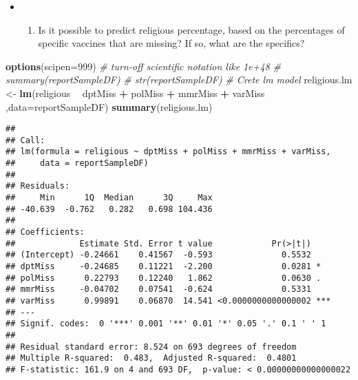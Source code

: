 \documentclass[]{article}
\newenvironment{Shaded}{\begin{snugshade}}{\end{snugshade}}
\newcommand{\CommentTok}[1]{\textcolor[rgb]{0.56,0.35,0.01}{\textit{#1}}}
\newcommand{\DataTypeTok}[1]{\textcolor[rgb]{0.13,0.29,0.53}{#1}}
\newcommand{\DecValTok}[1]{\textcolor[rgb]{0.00,0.00,0.81}{#1}}
\newcommand{\KeywordTok}[1]{\textcolor[rgb]{0.13,0.29,0.53}{\textbf{#1}}}
\newcommand{\NormalTok}[1]{#1}
\newcommand{\OperatorTok}[1]{\textcolor[rgb]{0.81,0.36,0.00}{\textbf{#1}}}
\newcommand{\StringTok}[1]{\textcolor[rgb]{0.31,0.60,0.02}{#1}}
\providecommand{\tightlist}{%
  \setlength{\itemsep}{0pt}\setlength{\parskip}{0pt}}
\begin{document}
\begin{itemize}
\item
  \begin{enumerate}
  \def\labelenumi{\arabic{enumi}.}
  \setcounter{enumi}{11}
  \tightlist
  \item
    Is it possible to predict religious percentage, based on the
    percentages of specific vaccines that are missing? If so, what are
    the specifics?
  \end{enumerate}
\end{itemize}

\begin{Shaded}
\begin{Highlighting}[]
\KeywordTok{options}\NormalTok{(}\DataTypeTok{scipen=}\DecValTok{999}\NormalTok{)  }\CommentTok{# turn-off scientific notation like 1e+48}
\CommentTok{# summary(reportSampleDF)}
\CommentTok{# str(reportSampleDF)}
\CommentTok{# Crete lm model}
\NormalTok{religious.lm <-}\StringTok{ }\KeywordTok{lm}\NormalTok{(religious }\OperatorTok{~}\StringTok{ }\NormalTok{dptMiss }\OperatorTok{+}\StringTok{ }\NormalTok{polMiss }\OperatorTok{+}\StringTok{ }\NormalTok{mmrMiss }\OperatorTok{+}\StringTok{ }\NormalTok{varMiss ,}\DataTypeTok{data=}\NormalTok{reportSampleDF) }
\KeywordTok{summary}\NormalTok{(religious.lm)}
\end{Highlighting}
\end{Shaded}

\begin{verbatim}
## 
## Call:
## lm(formula = religious ~ dptMiss + polMiss + mmrMiss + varMiss, 
##     data = reportSampleDF)
## 
## Residuals:
##     Min      1Q  Median      3Q     Max 
## -40.639  -0.762   0.282   0.698 104.436 
## 
## Coefficients:
##             Estimate Std. Error t value            Pr(>|t|)    
## (Intercept) -0.24661    0.41567  -0.593              0.5532    
## dptMiss     -0.24685    0.11221  -2.200              0.0281 *  
## polMiss      0.22793    0.12240   1.862              0.0630 .  
## mmrMiss     -0.04702    0.07541  -0.624              0.5331    
## varMiss      0.99891    0.06870  14.541 <0.0000000000000002 ***
## ---
## Signif. codes:  0 '***' 0.001 '**' 0.01 '*' 0.05 '.' 0.1 ' ' 1
## 
## Residual standard error: 8.524 on 693 degrees of freedom
## Multiple R-squared:  0.483,  Adjusted R-squared:  0.4801 
## F-statistic: 161.9 on 4 and 693 DF,  p-value: < 0.00000000000000022
\end{verbatim}

\begin{Shaded}
\end{Shaded}
\end{document}
